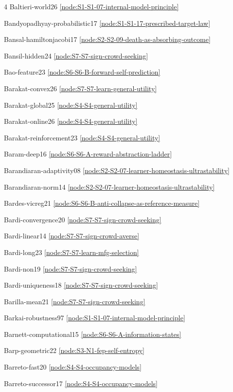 \documentclass[10pt]{article}
\begin{document}
{\begin{multicols}{4}
Baltieri-world26 \hfill \ref{node:S1-S1-07-internal-model-principle}\par
Bandyopadhyay-probabilistic17 \hfill \ref{node:S1-S1-17-prescribed-target-law}\par
Bansal-hamiltonjacobi17 \hfill \ref{node:S2-S2-09-death-as-absorbing-outcome}\par
Bansil-hidden24 \hfill \ref{node:S7-S7-sign-crowd-seeking}\par
Bao-feature23 \hfill \ref{node:S6-S6-B-forward-self-prediction}\par
Barakat-convex26 \hfill \ref{node:S7-S7-learn-general-utility}\par
Barakat-global25 \hfill \ref{node:S4-S4-general-utility}\par
Barakat-online26 \hfill \ref{node:S4-S4-general-utility}\par
Barakat-reinforcement23 \hfill \ref{node:S4-S4-general-utility}\par
Baram-deep16 \hfill \ref{node:S6-S6-A-reward-abstraction-ladder}\par
Barandiaran-adaptivity08 \hfill \ref{node:S2-S2-07-learner-homeostasis-ultrastability}\par
Barandiaran-norm14 \hfill \ref{node:S2-S2-07-learner-homeostasis-ultrastability}\par
Bardes-vicreg21 \hfill \ref{node:S6-S6-B-anti-collapse-as-reference-measure}\par
Bardi-convergence20 \hfill \ref{node:S7-S7-sign-crowd-seeking}\par
Bardi-linear14 \hfill \ref{node:S7-S7-sign-crowd-averse}\par
Bardi-long23 \hfill \ref{node:S7-S7-learn-mfg-selection}\par
Bardi-non19 \hfill \ref{node:S7-S7-sign-crowd-seeking}\par
Bardi-uniqueness18 \hfill \ref{node:S7-S7-sign-crowd-seeking}\par
Barilla-mean21 \hfill \ref{node:S7-S7-sign-crowd-seeking}\par
Barkai-robustness97 \hfill \ref{node:S1-S1-07-internal-model-principle}\par
Barnett-computational15 \hfill \ref{node:S6-S6-A-information-states}\par
Barp-geometric22 \hfill \ref{node:S3-N1-fep-self-entropy}\par
Barreto-fast20 \hfill \ref{node:S4-S4-occupancy-models}\par
Barreto-successor17 \hfill \ref{node:S4-S4-occupancy-models}\par

\end{multicols}}
\end{document}
